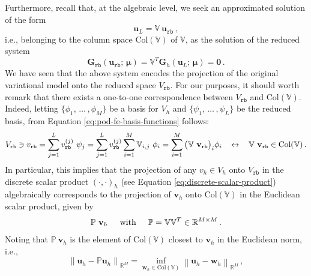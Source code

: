 \documentclass[12pt, a4paper, twoside, openright]{report}
\numberwithin{equation}{chapter}
\theoremstyle{theorem}
\theoremstyle{definition}
\theoremstyle{remark}
\theoremstyle{proposition}
\numberwithin{figure}{chapter}
\newcommand{\norm}[1]{\left\lVert#1\right\rVert}
\newcommand{\bg}[1]{\boldsymbol{#1}}
\begin{document}
		Furthermore, recall that, at the algebraic level, we seek an approximated solution of the form 
		\begin{equation*}
			\mathbf{u}_L = \mathbb{V} ~ \mathbf{u}_{\texttt{rb}} \, ,
		\end{equation*}
		i.e., belonging to the column space $\text{Col}(\mathbb{V})$ of $\mathbb{V}$, as the solution of the reduced system
		\begin{equation*}
			\mathbf{G}_{\texttt{rb}}(\mathbf{u}_{\texttt{rb}}; \, \bg{\mu}) = \mathbb{V}^T \mathbf{G}_h(\mathbf{u}_L; \, \bg{\mu}) = \mathbf{0} \, .
		\end{equation*}
		We have seen that the above system encodes the projection of the original variational model onto the reduced space $V_{\texttt{rb}}$. For our purposes, it should worth remark that there exists a one-to-one correspondence between $V_{\texttt{rb}}$ and $\text{Col}(\mathbb{V})$. Indeed, letting $\big\lbrace \phi_1, \, \ldots \, , \phi_M \big\rbrace$ be a basis for $V_h$ and $\big\lbrace \psi_1, \, \ldots \, , \psi_L \big\rbrace$ be the reduced basis, from Equation \eqref{eq:pod-fe-basis-functions} follows:
		\begin{equation*}
			V_{\texttt{rb}} \ni v_{\texttt{rb}} = \sum_{j = 1}^L v_{\texttt{rb}}^{(j)} ~ \psi_j = \sum_{j = 1}^L v_{\texttt{rb}}^{(j)} \sum_{i = 1}^M \mathbb{V}_{i,j} ~ \phi_i = \sum_{i = 1}^M \big( \mathbb{V} ~ \mathbf{v}_{\texttt{rb}} \big)_i \phi_i \hspace*{0.3cm} \leftrightarrow \hspace*{0.3cm} \mathbb{V} ~ \mathbf{v}_{\texttt{rb}} \in \text{Col}(\mathbb{V}) \, .
		\end{equation*} 
		In particular, this implies that the projection of any $v_h \in V_h$ onto $V_{\texttt{rb}}$ in the discrete scalar product $(\cdot,\cdot)_h$ (see Equation \eqref{eq:discrete-scalar-product}) algebraically corresponds to the projection of $\mathbf{v}_h$ onto $\text{Col}(\mathbb{V})$ in the Euclidean scalar product, given by
		\begin{equation*}
			\mathbb{P} ~ \mathbf{v}_h \hspace*{0.5cm} \text{with} \hspace*{0.5cm} \mathbb{P} = \mathbb{V} \mathbb{V}^T \in \mathbb{R}^{M \times M} \, .
		\end{equation*}
		Noting that $\mathbb{P} ~ \mathbf{v}_h$ is the element of $\text{Col}(\mathbb{V})$ closest to $\mathbf{v}_h$ in the Euclidean norm, i.e.,
		\begin{equation*}
			\norm{\mathbf{u}_h - \mathbb{P} \mathbf{u}_h}_{\mathbb{R}^M} = \inf_{\mathbf{w}_h \in \text{Col}(\mathbb{V})} \norm{\mathbf{u}_h - \mathbf{w}_h}_{\mathbb{R}^M} \, ,
		\end{equation*}
\end{document}

